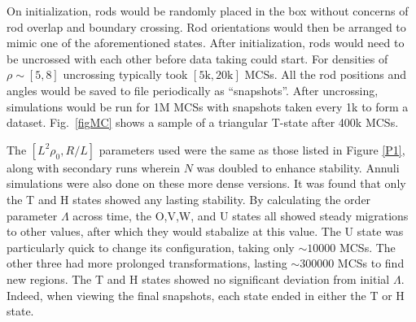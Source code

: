\documentclass[prl,twocolumn,preprintnumbers,reprint]{revtex4}
\begin{document}
On initialization, rods would be randomly placed in the box without concerns of rod overlap and boundary crossing. Rod orientations would then  be arranged to mimic one of the aforementioned states. After initialization, rods would need to be uncrossed with each other before data taking could start. For densities of $\rho\sim[5,8]$ uncrossing typically took $[5\text{k},20\text{k}]$ MCSs. All the rod positions and angles would be saved to file periodically as ``snapshots''. After uncrossing, simulations would be run for 1M MCSs with snapshots taken every 1k to form a dataset. Fig.\ \ref{figMC} shows a sample of a triangular T-state after 400k MCSs.

The $[L^2\rho_0,R/L]$ parameters used were the same as those listed in Figure \ref{P1}, along with secondary runs wherein $N$ was doubled to enhance stability. Annuli simulations were also done on these more dense versions. It was found that only the T and H states showed any lasting stability. By calculating the order parameter $\Lambda$ across time, the O,V,W, and U states all showed steady migrations to other values, after which they would stabalize at this value. The U state was particularly quick to change its configuration, taking only $\sim10 000$ MCSs. The other three had more prolonged transformations, lasting  $\sim300 000$ MCSs to find new regions. The T and H states showed no significant deviation from initial $\Lambda$. Indeed, when viewing the final snapshots, each state ended in either the T or H state.


%

%
%



\end{document}
